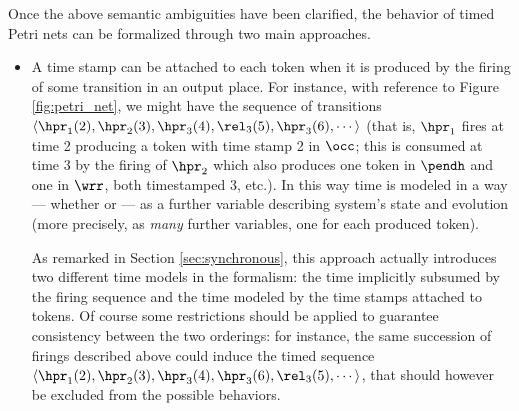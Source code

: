 Once the above semantic ambiguities have been clarified, the behavior 
of timed Petri nets can be formalized through two main approaches. 

\begin{itemize}
\item A time stamp can be attached to each token when it is produced 
by the firing of some transition in an output place. For instance, 
with reference to Figure \ref{fig:petri_net}, we might have the sequence of
transitions $\langle \hpr_1(2), \hpr_2(3), \linebreak \hpr_3(4), \rel_3(5), \hpr_3(6), \cdots \rangle$
(that is, $\hpr_1$ fires at time 2 producing a token with 
time stamp 2 in $\occ$; this is consumed at time 3 by the firing 
of $\hpr_2$ which also produces one token in $\pendh$ and 
one in $\wrr$, both timestamped 3, etc.). In this way time is 
 modeled in a  way --- whether  or  
--- as a further variable describing system's state and evolution 
(more precisely, as \emph{many} further variables, one for each 
produced token).

As remarked in Section \ref{sec:synchronous}, this approach actually introduces 
two different time models in the formalism: the time implicitly 
subsumed by the firing sequence and the time modeled by the time 
stamps attached to tokens. Of course some restrictions should 
be applied to guarantee consistency between the two orderings: 
for instance, the same succession of firings described above could induce the timed 
sequence $\langle \hpr_1(2), \hpr_2(3), \hpr_3(4), \linebreak \hpr_3(6), \rel_3(5), \cdots \rangle$,
that should however be excluded from the possible behaviors. 


\end{itemize}

